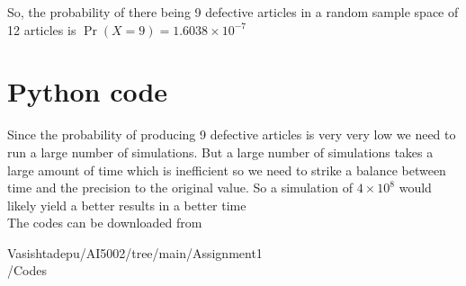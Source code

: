 \documentclass[journal,12pt,twocolumn]{IEEEtran}
\providecommand{\brak}[1]{\ensuremath{\left(#1\right)}}
\begin{document}
So, the probability of there being 9 defective articles in a random sample space of 12 articles is $\Pr\brak{X=9}=1.6038\times 10^{-7}$ 


\section*{Python code}
Since the probability of producing 9 defective articles is very very low we need to run a large number of simulations. But a large number of simulations takes a large amount of time which is inefficient so we need to strike a balance between time and the precision to the original value. So a simulation of $4\times10^8$ would likely yield a better results in a better time\\
The codes can be downloaded from

\begin{tcolorbox}{
Vasishtadepu/AI5002/tree/main/Assignment1\\/Codes
}
\end{tcolorbox}
\end{document}
